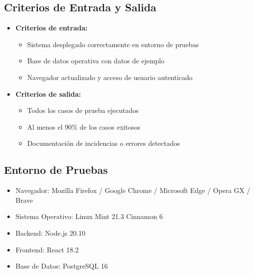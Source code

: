 \documentclass[12pt,letterpaper,spanish]{report}
\begin{document}
\subsection{Criterios de Entrada y Salida}
\begin{itemize}
    \item \textbf{Criterios de entrada:}
    \begin{itemize}
        \item Sistema desplegado correctamente en entorno de pruebas
        \item Base de datos operativa con datos de ejemplo
        \item Navegador actualizado y acceso de usuario autenticado
    \end{itemize}

    \item \textbf{Criterios de salida:}
    \begin{itemize}
        \item Todos los casos de prueba ejecutados
        \item Al menos el 90\% de los casos exitosos
        \item Documentaci\'on de incidencias o errores detectados
    \end{itemize}
\end{itemize}

\subsection{Entorno de Pruebas}
\begin{itemize}
    \item Navegador: Mozilla Firefox / Google Chrome / Microsoft Edge / Opera GX / Brave
    \item Sistema Operativo: Linux Mint 21.3 Cinnamon 6
    \item Backend: Node.js 20.10 
    \item Frontend: React 18.2  
    \item Base de Datos: PostgreSQL 16
\end{itemize}
\end{document}
